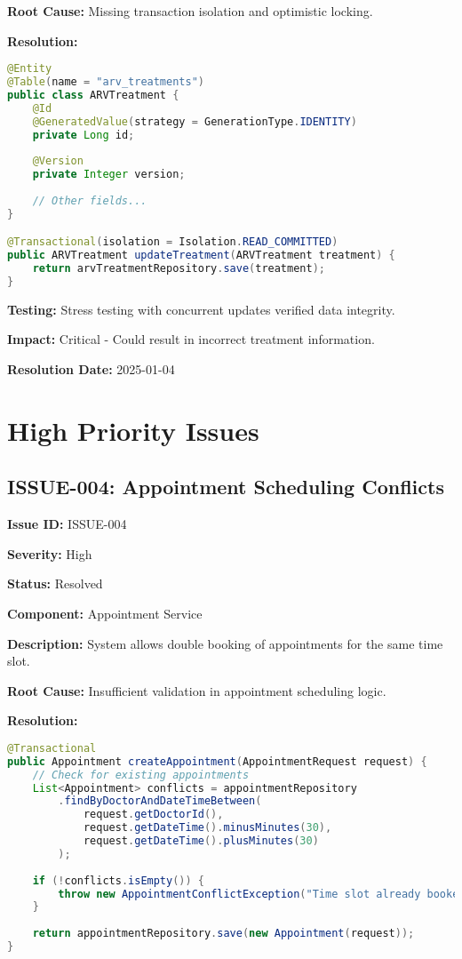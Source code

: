 \documentclass[12pt,a4paper]{article}
\begin{document}
\textbf{Root Cause:} Missing transaction isolation and optimistic locking.

\textbf{Resolution:}
\begin{lstlisting}[language=Java, caption=Optimistic Locking Implementation]
@Entity
@Table(name = "arv_treatments")
public class ARVTreatment {
    @Id
    @GeneratedValue(strategy = GenerationType.IDENTITY)
    private Long id;
    
    @Version
    private Integer version;
    
    // Other fields...
}

@Transactional(isolation = Isolation.READ_COMMITTED)
public ARVTreatment updateTreatment(ARVTreatment treatment) {
    return arvTreatmentRepository.save(treatment);
}
\end{lstlisting}

\textbf{Testing:} Stress testing with concurrent updates verified data integrity.

\textbf{Impact:} Critical - Could result in incorrect treatment information.

\textbf{Resolution Date:} 2025-01-04

\section{High Priority Issues}

\subsection{ISSUE-004: Appointment Scheduling Conflicts}

\textbf{Issue ID:} ISSUE-004

\textbf{Severity:} High

\textbf{Status:} Resolved

\textbf{Component:} Appointment Service

\textbf{Description:} System allows double booking of appointments for the same time slot.

\textbf{Root Cause:} Insufficient validation in appointment scheduling logic.

\textbf{Resolution:}
\begin{lstlisting}[language=Java, caption=Appointment Conflict Prevention]
@Transactional
public Appointment createAppointment(AppointmentRequest request) {
    // Check for existing appointments
    List<Appointment> conflicts = appointmentRepository
        .findByDoctorAndDateTimeBetween(
            request.getDoctorId(),
            request.getDateTime().minusMinutes(30),
            request.getDateTime().plusMinutes(30)
        );
    
    if (!conflicts.isEmpty()) {
        throw new AppointmentConflictException("Time slot already booked");
    }
    
    return appointmentRepository.save(new Appointment(request));
}
\end{lstlisting}
\end{document}
